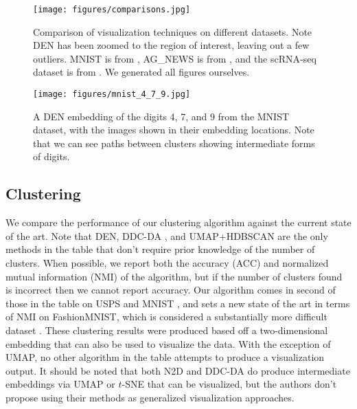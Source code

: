 \documentclass{article}
\begin{document}
\begin{figure}[]
    \centering
    \texttt{[image: figures/comparisons.jpg]}
    \caption{Comparison of visualization techniques on different datasets. Note DEN has been zoomed to the region of interest, leaving out a few outliers. MNIST is from \cite{lecun1998gradient}, AG\_NEWS is from \cite{gulli}, and the scRNA-seq dataset is from \cite{shekhar2016comprehensive}. We generated all figures ourselves.}
    \label{fig:labeled_vis_comparisons}
\end{figure}

\begin{figure}[]
    \centering
    \texttt{[image: figures/mnist\_4\_7\_9.jpg]}
    \caption{A DEN embedding of the digits 4, 7, and 9 from the MNIST dataset, with the images shown in their embedding locations. Note that we can see paths between clusters showing intermediate forms of digits.}
    \label{fig:mnist_embedding}
\end{figure}

\subsection{Clustering}

We compare the performance of our clustering algorithm against the current state of the art. Note that DEN, DDC-DA \cite{ren2020deep}, and UMAP+HDBSCAN are the only methods in the table that don't require prior knowledge of the number of clusters. When possible, we report both the accuracy (ACC) and normalized mutual information (NMI) of the algorithm, but if the number of clusters found is incorrect then we cannot report accuracy. Our algorithm comes in second of those in the table on USPS \cite{hull1994database} and MNIST \cite{lecun1998gradient}, and sets a new state of the art in terms of NMI on FashionMNIST, which is considered a substantially more difficult dataset \cite{xiao2017fashion}. These clustering results were produced based off a two-dimensional embedding that can also be used to visualize the data. With the exception of UMAP, no other algorithm in the table attempts to produce a visualization output. It should be noted that both N2D and DDC-DA do produce intermediate embeddings via UMAP or $t$-SNE that can be visualized, but the authors don't propose using their methods as generalized visualization approaches.
\end{document}
